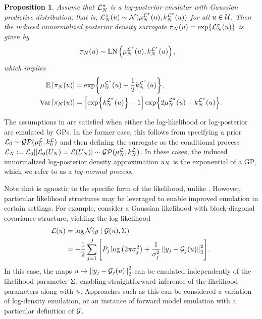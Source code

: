 \documentclass[12pt]{article}
\newtheorem{prop}{Proposition}
\begin{document}
\begin{prop} \label{prop:llik-em-Gaussian}
Assume that $\lpostEm[\Ndesign]$ is a log-posterior emulator with Gaussian predictive distribution; 
that is, $\lpostEm[\Ndesign](\Par) \sim \Gaussian(\emMean[\Ndesign]{\lpost}(\Par), \emKer[\Ndesign]{\lpost}(\Par))$
for all $\Par \in \parSpace$. Then the induced unnormalized posterior density surrogate 
$\postEm[\Ndesign](\Par) = \Exp{\lpostEm[\Ndesign](\Par)}$ is given by
\begin{align}
\postEm[\Ndesign](\Par) &\sim \text{LN}\left(\emMean[\Ndesign]{\lpost}(\Par), \emKer[\Ndesign]{\lpost}(\Par)\right),
\end{align}
which implies 
\begin{align}
\E\left[\postEm[\Ndesign](\Par)\right] &= \Exp{\emMean[\Ndesign]{\lpost}(\Par) + \frac{1}{2}\emKer[\Ndesign]{\lpost}(\Par)}, \\
\Var\left[\postEm[\Ndesign](\Par)\right] &= \left[\Exp{\emKer[\Ndesign]{\lpost}(\Par)} - 1\right] \Exp{2\emMean[\Ndesign]{\lpost}(\Par) + \emKer[\Ndesign]{\lpost}(\Par)}.
\end{align}
\end{prop}

The assumptions in  are satisfied when either the 
log-likelihood or log-posterior are emulated by GPs. In the former case,
this follows from specifying a prior 
$\llikEm[0] \sim \GP(\emMean[0]{\llik}, \emKer[0]{\llik})$ and then defining 
the surrogate as the conditional process
$\llikEm[\Ndesign] \Def \llikPrior | [\llikPrior(\designIn) = \llik(\designIn)] \sim \GP(\emMean[\Ndesign]{\llik}, \emKer[\Ndesign]{\llik})$.
In these cases, the induced unnormalized log-posterior density approximation 
$\postEm[\Ndesign]$ is the exponential of a GP, which we refer to as a 
\textit{log-normal process}.

Note that  is agnostic to the specific form of the 
likelihood, unlike . However, particular likelihood
structures may be leveraged to enable improved emulation in certain settings. For example, 
\citet{FerEmulation} consider a Gaussian likelihood with block-diagonal covariance structure, yielding
the log-likelihood
\begin{align}
\llik(\Par) 
&= \log \Gaussian(\obs \given \fwd(\Par), \likPar) \nonumber \\
&= - \frac{1}{2} \sum_{j=1}^{J} \left[\dimObs_j \log\left(2\pi\sigma_j^2\right) +
 \frac{1}{\sigma_j^2} \norm{\obs_j - \fwd_j(\Par)}_2^2 \right].
\end{align}
In this case, the maps $\Par \mapsto \norm{\obs_j - \fwd_j(\Par)}_2^2$ can be emulated 
independently of the likelihood parameter $\likPar$, enabling straightforward inference of the 
likelihood parameters along with $\Par$.
Approaches such as this can be considered a variation of log-density emulation, or an instance of 
forward model emulation with a particular definition of $\fwd$.
 
\end{document}
